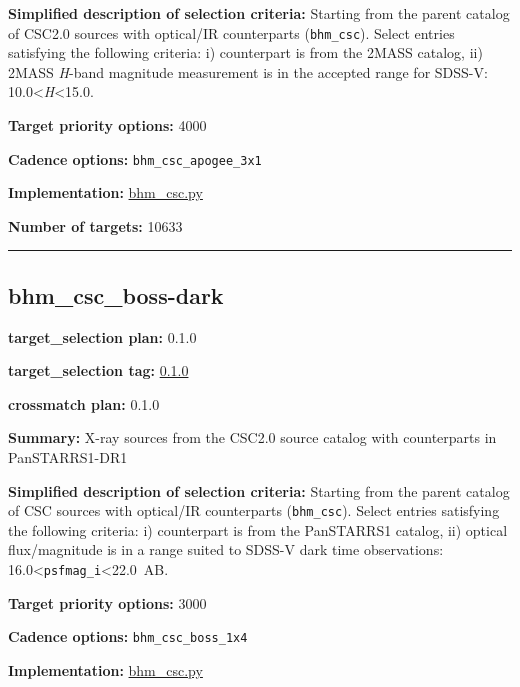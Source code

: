 \noindent\textbf{Simplified description of selection criteria:} Starting from the
parent catalog of CSC2.0 sources with optical/IR counterparts
(\texttt{bhm\_csc}). Select entries satisfying the following criteria:
i) counterpart is from the 2MASS catalog, ii) 2MASS \emph{H}-band
magnitude measurement is in the accepted range for SDSS-V:
10.0\textless{}\emph{H}\textless15.0.


\noindent\textbf{Target priority options:} 4000

\noindent\textbf{Cadence options:} \texttt{bhm\_csc\_apogee\_3x1}

\noindent\textbf{Implementation:}
\href{https://github.com/sdss/target_selection/blob/0.1.0/python/target_selection/cartons/bhm_csc.py}{bhm\_csc.py}

\noindent\textbf{Number of targets:} 10633

\begin{center}\rule{0.5\linewidth}{0.5pt}\end{center}

\hypertarget{bhm_csc_boss-dark_plan0.1.0}{%
\subsection{bhm\_csc\_boss-dark}\label{bhm_csc_boss-dark_plan0.1.0}}

\noindent\textbf{target\_selection plan:} 0.1.0

\noindent\textbf{target\_selection tag:}
\href{https://github.com/sdss/target_selection/tree/0.1.0/}{0.1.0}

\noindent\textbf{crossmatch plan:} 0.1.0

\noindent\textbf{Summary:} X-ray sources from the CSC2.0 source catalog with
counterparts in PanSTARRS1-DR1

\noindent\textbf{Simplified description of selection criteria:} Starting from the
parent catalog of CSC sources with optical/IR counterparts
(\texttt{bhm\_csc}). Select entries satisfying the following criteria:
i) counterpart is from the PanSTARRS1 catalog, ii) optical
flux/magnitude is in a range suited to SDSS-V dark time observations:
16.0\textless{}\texttt{psfmag\_i}\textless22.0~AB.


\noindent\textbf{Target priority options:} 3000

\noindent\textbf{Cadence options:} \texttt{bhm\_csc\_boss\_1x4}

\noindent\textbf{Implementation:}
\href{https://github.com/sdss/target_selection/blob/0.1.0/python/target_selection/cartons/bhm_csc.py}{bhm\_csc.py}

